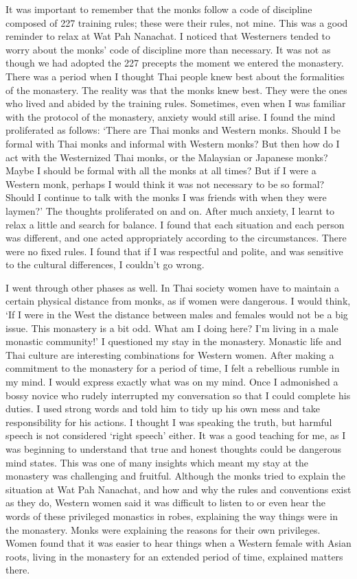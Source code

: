 It was important to remember that the monks follow a code of discipline
composed of 227 training rules; these were their rules, not mine. This
was a good reminder to relax at Wat Pah Nanachat. I noticed that
Westerners tended to worry about the monks' code of discipline more than
necessary. It was not as though we had adopted the 227 precepts the
moment we entered the monastery. There was a period when I thought Thai
people knew best about the formalities of the monastery. The reality was
that the monks knew best. They were the ones who lived and abided by the
training rules. Sometimes, even when I was familiar with the protocol of
the monastery, anxiety would still arise. I found the mind proliferated
as follows: `There are Thai monks and Western monks. Should I be formal
with Thai monks and informal with Western monks? But then how do I act
with the Westernized Thai monks, or the Malaysian or Japanese monks? 
Maybe I should be formal with all the monks at all times? But if I were
a Western monk, perhaps I would think it was not necessary to be so
formal? Should I continue to talk with the monks I was friends with when
they were laymen?' The thoughts proliferated on and on. After much
anxiety, I learnt to relax a little and search for balance. I found that
each situation and each person was different, and one acted
appropriately according to the circumstances. There were no fixed rules. 
I found that if I was respectful and polite, and was sensitive to the
cultural differences, I couldn't go wrong. 

I went through other phases as well. In Thai society women have to
maintain a certain physical distance from monks, as if women were
dangerous. I would think, `If I were in the West the distance between
males and females would not be a big issue. This monastery is a bit odd. 
What am I doing here? I'm living in a male monastic community!' I
questioned my stay in the monastery. Monastic life and Thai culture are
interesting combinations for Western women. After making a commitment to
the monastery for a period of time, I felt a rebellious rumble in my
mind. I would express exactly what was on my mind. Once I admonished a
bossy novice who rudely interrupted my conversation so that I could
complete his duties. I used strong words and told him to tidy up his own
mess and take responsibility for his actions. I thought I was speaking
the truth, but harmful speech is not considered `right speech' either. 
It was a good teaching for me, as I was beginning to understand that
true and honest thoughts could be dangerous mind states. This was one of
many insights which meant my stay at the monastery was challenging and
fruitful. Although the monks tried to explain the situation at Wat Pah
Nanachat, and how and why the rules and conventions exist as they do, 
Western women said it was difficult to listen to or even hear the words
of these privileged monastics in robes, explaining the way things were
in the monastery. Monks were explaining the reasons for their own
privileges. Women found that it was easier to hear things when a Western
female with Asian roots, living in the monastery for an extended period
of time, explained matters there. 

